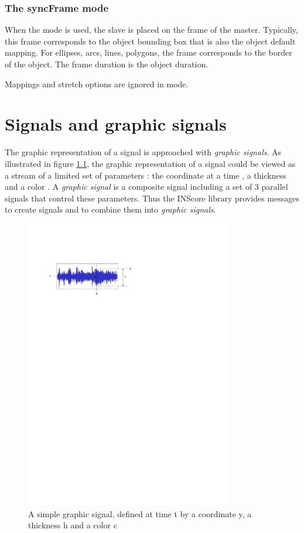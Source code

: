 \documentclass[a4paper,twoside]{report}
\newcommand{\toplevel}[1]	{\chapter{#1}}
\newcommand{\subsublevel}[1]	{\subsection{#1}}
\begin{document}
\subsublevel{The syncFrame mode}
\label{syncFrame}

When the  mode is used, the slave is placed on the frame of the master. Typically, this frame corresponds to the object bounding box that is also the object default mapping. For ellipses, arcs, lines, polygons, the frame corresponds to the border of the object. The frame duration is the object duration.  

Mappings and stretch options are ignored in   mode.


\toplevel{Signals and graphic signals}
\label{graphsig}

The graphic representation of a signal is approached with \emph{graphic signals}. As illustrated in figure \ref{graphimg}, the graphic representation of a signal could be viewed as a stream of a limited set of parameters : the  coordinate at a time , a thickness  and a color . 
A \emph{graphic signal} is a composite signal including a set of 3 parallel signals that control these parameters. Thus the INScore library provides messages to create signals and to combine them into \emph{graphic signals}. 

\begin{figure}[h]
	\centering \includegraphics[width=90mm]{imgs/graph}
 \caption{A simple graphic signal, defined at time t by a coordinate y, a thickness h and a color c}
 \label{graphimg}
\end{figure}
\end{document}
